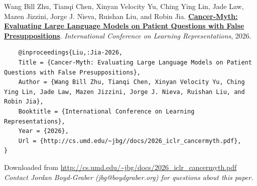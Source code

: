 \documentclass[a4paper]{article}
\begin{document}
    Wang Bill Zhu, Tianqi Chen, Xinyan Velocity Yu, Ching Ying Lin, Jade Law, Mazen Jizzini, Jorge J. Nieva, Ruishan Liu, and Robin Jia.  {\bf \href{http://cs.umd.edu/~jbg//docs/2026_iclr_cancermyth.pdf}{Cancer-Myth: Evaluating Large Language Models on Patient Questions with False Presuppositions}}.  \emph{International Conference on Learning Representations}, 2026.



    \vspace{5cm}

    \begin{verbatim}
    @inproceedings{Liu,:Jia-2026,
	Title = {Cancer-Myth: Evaluating Large Language Models on Patient Questions with False Presuppositions},
	Author = {Wang Bill Zhu, Tianqi Chen, Xinyan Velocity Yu, Ching Ying Lin, Jade Law, Mazen Jizzini, Jorge J. Nieva, Ruishan Liu, and Robin Jia},
	Booktitle = {International Conference on Learning Representations},
	Year = {2026},
	Url = {http://cs.umd.edu/~jbg//docs/2026_iclr_cancermyth.pdf},
}

    \end{verbatim}

    

    

    

    \vspace{3cm}
    Downloaded from \url{http://cs.umd.edu/~jbg/docs/2026_iclr_cancermyth.pdf}  \\

    \vspace{2cm}
    \textit{Contact Jordan Boyd-Graber (jbg@boydgraber.org) for questions about this paper.}

    

    
\end{document}
